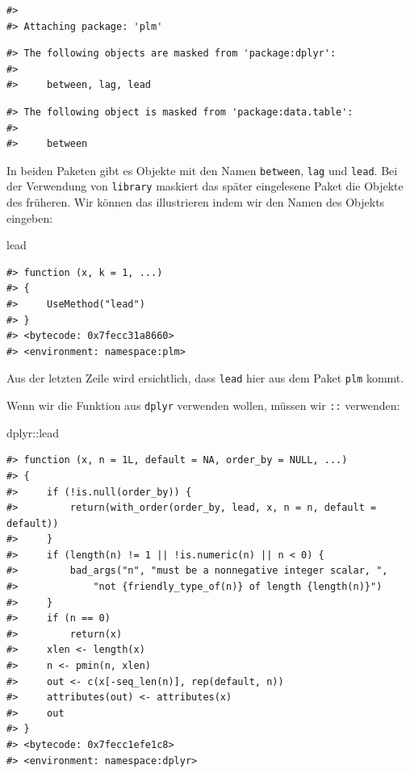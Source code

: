 \documentclass[]{tufte-book}
\newenvironment{Shaded}{}{}
\newcommand{\OperatorTok}[1]{\textcolor[rgb]{0.40,0.40,0.40}{#1}}
\newcommand{\NormalTok}[1]{#1}
\begin{document}
\begin{verbatim}
#> 
#> Attaching package: 'plm'
\end{verbatim}

\begin{verbatim}
#> The following objects are masked from 'package:dplyr':
#> 
#>     between, lag, lead
\end{verbatim}

\begin{verbatim}
#> The following object is masked from 'package:data.table':
#> 
#>     between
\end{verbatim}

In beiden Paketen gibt es Objekte mit den Namen \texttt{between},
\texttt{lag} und \texttt{lead}. Bei der Verwendung von \texttt{library}
maskiert das später eingelesene Paket die Objekte des früheren. Wir
können das illustrieren indem wir den Namen des Objekts eingeben:

\begin{Shaded}
\begin{Highlighting}[]
\NormalTok{lead}
\end{Highlighting}
\end{Shaded}

\begin{verbatim}
#> function (x, k = 1, ...) 
#> {
#>     UseMethod("lead")
#> }
#> <bytecode: 0x7fecc31a8660>
#> <environment: namespace:plm>
\end{verbatim}

Aus der letzten Zeile wird ersichtlich, dass \texttt{lead} hier aus dem
Paket \texttt{plm} kommt.

Wenn wir die Funktion aus \texttt{dplyr} verwenden wollen, müssen wir
\texttt{::} verwenden:

\begin{Shaded}
\begin{Highlighting}[]
\NormalTok{dplyr}\OperatorTok{::}\NormalTok{lead}
\end{Highlighting}
\end{Shaded}

\begin{verbatim}
#> function (x, n = 1L, default = NA, order_by = NULL, ...) 
#> {
#>     if (!is.null(order_by)) {
#>         return(with_order(order_by, lead, x, n = n, default = default))
#>     }
#>     if (length(n) != 1 || !is.numeric(n) || n < 0) {
#>         bad_args("n", "must be a nonnegative integer scalar, ", 
#>             "not {friendly_type_of(n)} of length {length(n)}")
#>     }
#>     if (n == 0) 
#>         return(x)
#>     xlen <- length(x)
#>     n <- pmin(n, xlen)
#>     out <- c(x[-seq_len(n)], rep(default, n))
#>     attributes(out) <- attributes(x)
#>     out
#> }
#> <bytecode: 0x7fecc1efe1c8>
#> <environment: namespace:dplyr>
\end{verbatim}
\end{document}
